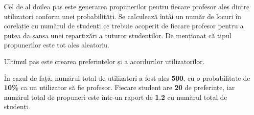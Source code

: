 Cel de al doilea pas este generarea propunerilor pentru fiecare profesor ales dintre utilizatori conform unei probabilități. Se calculează întâi un număr de locuri în corelație cu numărul de studenți ce trebuie acoperit de fiecare profesor pentru a putea da șansa unei repartizări a tuturor studenților. De menționat că tipul propunerilor este tot ales aleatoriu.

Ultimul pas este crearea preferințelor și a acordurilor utilizatorilor.

În cazul de față, numărul total de utilizatori a fost ales \textbf{500}, cu o probabilitate de \textbf{10\%} ca un utilizator să fie profesor. Fiecare student are \textbf{20} de preferințe, iar numărul total de propuneri este într-un raport de \textbf{1.2} cu numărul total de studenți.